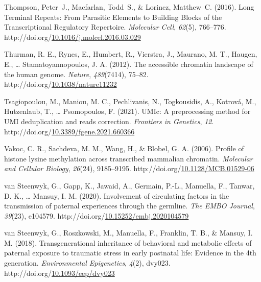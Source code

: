 \documentclass[12pt,twoside]{reedthesis}
\newlength{\cslhangindent}
\newenvironment{CSLReferences}[2] %
 {%
  \setlength{\parindent}{0pt}
  \ifodd #1 \everypar{\setlength{\hangindent}{\cslhangindent}}\ignorespaces\fi
  \ifnum #2 > 0
  \setlength{\parskip}{#2\baselineskip}
  \fi
 }%
 {}
\begin{document}
\begin{CSLReferences}{1}{0}
\leavevmode{}%
Thompson, Peter~J., Macfarlan, Todd~S., \& Lorincz, Matthew~C. (2016). Long Terminal Repeats: From Parasitic Elements to Building Blocks of the Transcriptional Regulatory Repertoire. \emph{Molecular Cell}, \emph{62}(5), 766--776. http://doi.org/\href{https://doi.org/10.1016/j.molcel.2016.03.029}{10.1016/j.molcel.2016.03.029}

\leavevmode{}%
Thurman, R. E., Rynes, E., Humbert, R., Vierstra, J., Maurano, M. T., Haugen, E., \ldots{} Stamatoyannopoulos, J. A. (2012). The accessible chromatin landscape of the human genome. \emph{Nature}, \emph{489}(7414), 75--82. http://doi.org/\href{https://doi.org/10.1038/nature11232}{10.1038/nature11232}

\leavevmode{}%
Tsagiopoulou, M., Maniou, M. C., Pechlivanis, N., Togkousidis, A., Kotrová, M., Hutzenlaub, T., \ldots{} Psomopoulos, F. (2021). UMIc: A preprocessing method for UMI deduplication and reads correction. \emph{Frontiers in Genetics}, \emph{12}. http://doi.org/\href{https://doi.org/10.3389/fgene.2021.660366}{10.3389/fgene.2021.660366}

\leavevmode{}%
Vakoc, C. R., Sachdeva, M. M., Wang, H., \& Blobel, G. A. (2006). Profile of histone lysine methylation across transcribed mammalian chromatin. \emph{Molecular and Cellular Biology}, \emph{26}(24), 9185--9195. http://doi.org/\href{https://doi.org/10.1128/MCB.01529-06}{10.1128/MCB.01529-06}

\leavevmode{}%
van Steenwyk, G., Gapp, K., Jawaid, A., Germain, P.-L., Manuella, F., Tanwar, D. K., \ldots{} Mansuy, I. M. (2020). Involvement of circulating factors in the transmission of paternal experiences through the germline. \emph{The EMBO Journal}, \emph{39}(23), e104579. http://doi.org/\href{https://doi.org/10.15252/embj.2020104579}{10.15252/embj.2020104579}

\leavevmode{}%
van Steenwyk, G., Roszkowski, M., Manuella, F., Franklin, T. B., \& Mansuy, I. M. (2018). Transgenerational inheritance of behavioral and metabolic effects of paternal exposure to traumatic stress in early postnatal life: Evidence in the 4th generation. \emph{Environmental Epigenetics}, \emph{4}(2), dvy023. http://doi.org/\href{https://doi.org/10.1093/eep/dvy023}{10.1093/eep/dvy023}


\end{CSLReferences}
\end{document}
